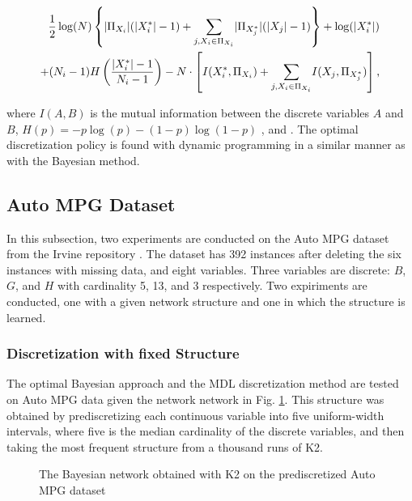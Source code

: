 \begin{equation}
\begin{aligned}
\frac{1}{2} \log(N) \left\lbrace  \lvert \Pi_{X_i} \rvert (\lvert X^*_i \rvert - 1) +
 {\sum_{j,X_i \in \Pi_{X_i}}} \lvert \Pi_{X^*_j} \rvert (\lvert X_j \rvert - 1) \right\rbrace + \log(\lvert {X^*_i} \rvert) \\
 + (N_i-1) H \left( {{|X^*_i| - 1}\over{N_i -1}}  \right) -N \cdot \left[ I(X^*_i,\Pi_{X_i}) + {\sum_{j,X_i \in \Pi_{X_i}}} I(X_j, \Pi_{X^*_j}) \right]\text{,}
\end{aligned}
\end{equation}

where $I(A,B)$ is the mutual information between the discrete variables $A$ and $B$, ${H(p) = -p \log(p) - (1-p) \log(1-p)}$ , and .
The optimal discretization policy is found with dynamic programming in a similar manner as with the Bayesian method.


\subsection{Auto MPG Dataset}
\label{subsec:auto}

In this subsection, two experiments are conducted on the Auto MPG dataset from the Irvine repository \citep{Lichman_2013}. The dataset has \num{392} instances after deleting the six instances with missing data, and eight variables. Three variables are discrete: $B$, $G$, and $H$ with cardinality \num{5}, \num{13}, and \num{3} respectively. Two expiriments are conducted, one with a given network structure and one in which the structure is learned.

\subsubsection{Discretization with fixed Structure}
\label{subsubsec:auto_exp1}

The optimal Bayesian approach and the MDL discretization method are tested on Auto MPG data given the network network in Fig. \ref{fig:auto_graph_1}. This structure was obtained by prediscretizing each continuous variable into five uniform-width intervals, where five is the median cardinality of the discrete variables, and then taking the most frequent structure from a thousand runs of K2. 

\begin{figure}[ht]
  \centering
   
   \caption{The Bayesian network obtained with K2 on the prediscretized Auto MPG dataset}
  \label{fig:auto_graph_1}
\end{figure}

